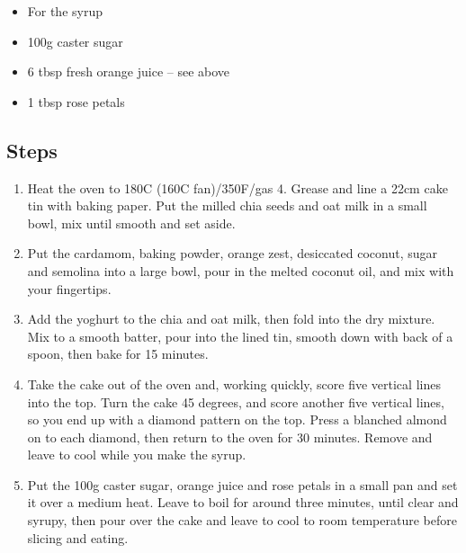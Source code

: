\documentclass{book}
\begin{document}
\begin{itemize}
\item For the syrup
\item 100g caster sugar 
\item 6 tbsp fresh orange juice – see above
\item 1 tbsp rose petals
\end{itemize}

\subsection*{Steps}
\begin{enumerate}
\item Heat the oven to 180C (160C fan)/350F/gas 4. Grease and line a 22cm cake tin with baking paper. Put the milled chia seeds and oat milk in a small bowl, mix until smooth and set aside.
\item Put the cardamom, baking powder, orange zest, desiccated coconut, sugar and semolina into a large bowl, pour in the melted coconut oil, and mix with your fingertips.
\item Add the yoghurt to the chia and oat milk, then fold into the dry mixture. Mix to a smooth batter, pour into the lined tin, smooth down with back of a spoon, then bake for 15 minutes.
\item Take the cake out of the oven and, working quickly, score five vertical lines into the top. Turn the cake 45 degrees, and score another five vertical lines, so you end up with a diamond pattern on the top. Press a blanched almond on to each diamond, then return to the oven for 30 minutes. Remove and leave to cool while you make the syrup.
\item Put the 100g caster sugar, orange juice and rose petals in a small pan and set it over a medium heat. Leave to boil for around three minutes, until clear and syrupy, then pour over the cake and leave to cool to room temperature before slicing and eating.
\end{enumerate}
\newpage
\end{document}
